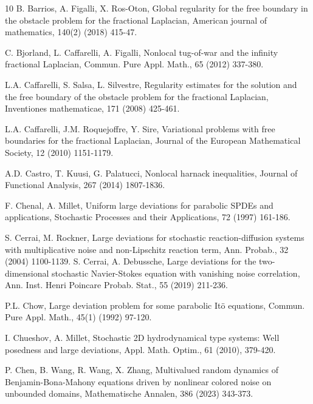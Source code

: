 \documentclass[11pt]{article}
\numberwithin{equation}{section}
\begin{document}
\begin{thebibliography}{10}
B. Barrios, A. Figalli, X. Ros-Oton, Global regularity for the free boundary in the obstacle problem for the fractional Laplacian, American journal of mathematics, 140(2) (2018) 415-47.


C. Bjorland, L. Caffarelli, A. Figalli, Nonlocal tug-of-war and the infinity fractional
Laplacian, Commun. Pure Appl. Math.,  65 (2012) 337-380.

L.A. Caffarelli, S. Salsa,  L. Silvestre, Regularity estimates for the solution and the free boundary of the obstacle problem for the fractional Laplacian, Inventiones mathematicae, 171 (2008) 425-461.

L.A. Caffarelli, J.M. Roquejoffre, Y. Sire, Variational problems with free boundaries for the fractional Laplacian, Journal of the European Mathematical Society,  12 (2010) 1151-1179.

A.D. Castro, T. Kuusi, G. Palatucci, Nonlocal harnack inequalities, Journal of Functional Analysis, 267 (2014) 1807-1836.




F. Chenal, A. Millet, Uniform large deviations for parabolic SPDEs and
applications, Stochastic Processes and their Applications, 72 (1997) 161-186.



 S. Cerrai, M. Rockner, Large deviations for stochastic reaction-diffusion systems with
multiplicative noise and non-Lipschitz reaction term, Ann. Probab., 32 (2004) 1100-1139.
S. Cerrai, A. Debussche, Large deviations for the two-dimensional stochastic Navier-Stokes
equation with vanishing noise correlation, Ann. Inst. Henri Poincare Probab. Stat., 55 (2019)
211-236.



P.L. Chow, Large deviation problem for some parabolic It\"{o} equations, Commun. Pure
Appl. Math., 45(1) (1992) 97-120.

I. Chueshov, A. Millet, Stochastic 2D hydrodynamical type systems: Well posedness and
large deviations, Appl. Math. Optim., 61 (2010), 379-420.


P. Chen, B. Wang, R. Wang, X. Zhang, Multivalued random dynamics
of Benjamin-Bona-Mahony equations driven by nonlinear colored noise on unbounded domains, Mathematische Annalen, 386 (2023) 343-373.




\end{thebibliography}
\end{document}

